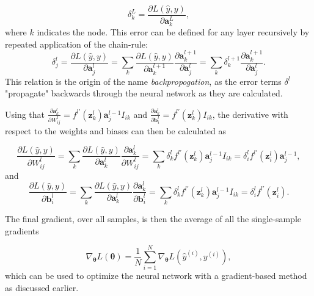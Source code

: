 \begin{equation}\label{eq:lastLayerError}
    \delta^L_k = \frac{\partial L(\hat{y}, y)}{\partial \boldsymbol{a}^L_k},
\end{equation}
where $k$ indicates the node. This error can be defined for any layer recursively by repeated application of the chain-rule:
\begin{equation}\label{eq:error}
    \delta^l_j = \frac{\partial L(\hat{y}, y)}{\partial \boldsymbol{a}^l_j} 
    = \sum_k \frac{\partial L(\hat{y}, y)}{\partial \boldsymbol{a}^{l+1}_k} \frac{\partial \boldsymbol{a}^{l+1}_k}{\partial \boldsymbol{a}^{l}_j}
    = \sum_k \delta^{l+1}_k \frac{\partial \boldsymbol{a}^{l+1}_k}{\partial \boldsymbol{a}^{l}_j}.
\end{equation}
This relation is the origin of the name \emph{backpropogation}, as the error terms $\delta^l$ "propagate" backwards through the neural network as they are calculated.

Using that 
$\frac{\partial \boldsymbol{a}^{l}_k}{\partial W^l_{ij}} = f^{l\prime}(\boldsymbol{z}^{l}_k)\boldsymbol{a}^{l-1}_j I_{ik}$ 
and 
$\frac{\partial \boldsymbol{a}^{l}_k}{\partial \boldsymbol{b}^l_{i}} = f^{l\prime}(\boldsymbol{z}^{l}_k) I_{ik}$, the derivative with respect to the weights and biases can then be calculated as 

\begin{equation}\label{eq:derivweights}
    \frac{\partial L(\hat{y}, y)}{\partial W^l_{ij}} = 
    \sum_k \frac{\partial L(\hat{y}, y)}{\partial \boldsymbol{a}^{l}_k} \frac{\partial \boldsymbol{a}^{l}_k}{\partial W^l_{ij}} = 
    \sum_k \delta^{l}_k f^{l\prime}(\boldsymbol{z}^{l}_k)\boldsymbol{a}^{l-1}_j I_{ik}=
    \delta^{l}_i f^{l\prime}(\boldsymbol{z}^l_i) \boldsymbol{a}^{l-1}_j,
\end{equation}
and
\begin{equation}\label{eq:derivbiases}
    \frac{\partial L(\hat{y}, y)}{\partial \boldsymbol{b}^l_{i}} = 
    \sum_k \frac{\partial L(\hat{y}, y)}{\partial \boldsymbol{a}^{l}_k} \frac{\partial \boldsymbol{a}^{l}_k}{\partial \boldsymbol{b}^l_{i}} = 
    \sum_k \delta^{l}_k f^{l\prime}(\boldsymbol{z}^{l}_k)\boldsymbol{a}^{l-1}_j I_{ik}=
    \delta^{l}_i f^{l\prime}(\boldsymbol{z}^l_i).
\end{equation}

The final gradient, over all samples, is then the average of all the single-sample gradients

\begin{equation}\label{eq:averageGradient}
    \nabla_{\boldsymbol{\theta}} L(\boldsymbol{\theta}) = \frac{1}{N}\sum_{i=1}^N \nabla_{\boldsymbol{\theta}} L(\hat{y}^{(i)}, y^{(i)}),
\end{equation}
which can be used to optimize the neural network with a gradient-based method as discussed earlier.


